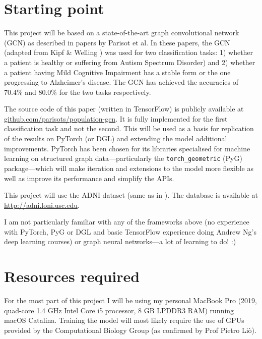 \documentclass[12pt,a4paper,twoside]{article}
\begin{document}
\section*{Starting point}


This project will be based on a state-of-the-art graph convolutional network (GCN) as described in papers by Parisot et al. \cite{parisot2017spectral, parisot2018disease} In these papers, the GCN (adapted from Kipf \& Welling \cite{kipf2017semi}) was used for two classification tasks: 1) whether a patient is  healthy or suffering from Autism Spectrum Disorder) and 2) whether a patient having Mild Cognitive Impairment has a stable form or the one progressing to Alzheimer's disease. The GCN has achieved the accuracies of 70.4\% and 80.0\% for the two tasks respectively. 

The source code of this paper (written in TensorFlow) is publicly available at \url{github.com/parisots/population-gcn}. It is fully implemented for the first classification task and not the second. This will be used as a basis for replication of the results on PyTorch (or DGL) and extending the model additional improvements. PyTorch has been chosen for its libraries specialised for machine learning on structured graph data—particularly the \texttt{torch\_geometric} (PyG) package—which will make iteration and extensions to the model more flexible as well as improve its performance and simplify the APIs.

This project will use the ADNI dataset (same as in \cite{parisot2017spectral,parisot2018disease}). The database is available at \url{http://adni.loni.usc.edu}.

I am not particularly familiar with any of the frameworks above (no experience with PyTorch, PyG or DGL and basic TensorFlow experience doing Andrew Ng's deep learning courses) or graph neural networks—a lot of learning to do! :)

\section*{Resources required}

For the most part of this project I will be using my personal MacBook Pro (2019, quad-core 1.4 GHz Intel Core i5 processor, 8 GB LPDDR3 RAM) running macOS Catalina. Training the model will most likely require the use of GPUs provided by the Computational Biology Group (as confirmed by Prof Pietro Liò).
\end{document}
